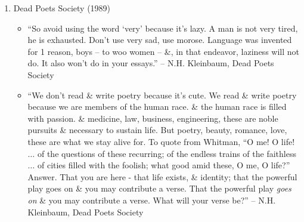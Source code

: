 \documentclass{article}
\begin{document}
\begin{enumerate}
\begin{itemize}
		\item ``What if God doesn't know what he's doing? If the plan is wrong? If God is wrong?''
		\item ``You came in the door like thunder. Then hit the floor like thunder. Laying me down you wonder. Shaking the walls like thunder.''
		\item ``My only aim is to take many lives. The more the better I feel.''
		\item ``The world is full of such paradoxes we simply choose to ignore them most of the time.''
		\item ``In the end we will all get just what we deserve.''
		\item ``In short, the god mankind has prayed to for thousands of years the god that everything is bound with, this god exists as nothing other than time itself.''
		\item ``Death is always inevitable. Destiny is nothing but the connection of cause \& effect. In light, in shadow.''
		\item ``I'm just a tiny section of a huge tumor that is much bigger than any of us can imagine.''
		\item ``There are moments when we must understand that the decisions we make influence more than just our own fates.''
		\item ``We're wanderers in the darkness.''
		\item ``The pain is his vessel, desire his compass. It is all that man is capable of.''
		\item ``Fold out your hands. Give me a sign. Put down your lies. Lay down next to me. Don't listen when I scream. Bury your doubts \& fall asleep. For neither ever. Nor never.''
		\item ``Time is God.''
	\end{itemize}
	\item {\sc Dead Poets Society} (1989)
	\begin{itemize}
		\item ``So avoid using the word `very' because it's lazy. A man is not very tired, he is exhausted. Don't use very sad, use morose. Language was invented for 1 reason, boys -- to woo women -- \&, in that endeavor, laziness will not do. It also won't do in your essays.'' --  N.H. Kleinbaum, Dead Poets Society
		\item ``We don't read \& write poetry because it's cute. We read \& write poetry because we are members of the human race. \& the human race is filled with passion. \& medicine, law, business, engineering, these are noble pursuits \& necessary to sustain life. But poetry, beauty, romance, love, these are what we stay alive for. To quote from Whitman, ``O me! O life! $\ldots$ of the questions of these recurring; of the endless trains of the faithless $\ldots$ of cities filled with the foolish; what good amid these, O me, O life?'' Answer. That you are here - that life exists, \& identity; that the powerful play goes on \& you may contribute a verse. That the powerful play \emph{goes on} \& you may contribute a verse. What will your verse be?'' --  N.H. Kleinbaum, Dead Poets Society

\end{itemize}
\end{enumerate}
\end{document}
